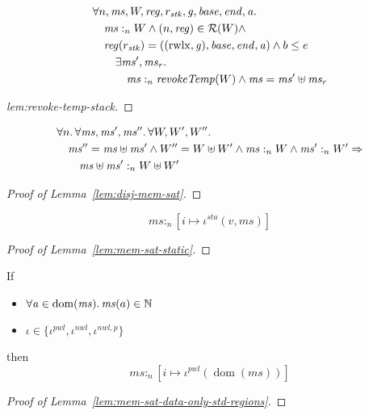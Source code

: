\documentclass[a4paper]{article}
\DeclareMathOperator{\dom}{dom}
\newcommand{\var}[1]{\mathit{#1}}
\newcommand{\hs}{\var{ms}}
\newcommand{\ms}{\hs}
\newcommand{\gl}{\var{g}}
\newcommand{\addr}{\var{a}}
\newcommand{\start}{\var{base}}
\newcommand{\addrend}{\var{end}}
\newcommand{\reg}{\var{reg}}
\newcommand{\heap}{\var{mem}}
\newcommand{\stk}{\var{stk}}
\newcommand{\nwl}{\var{nwl}}
\newcommand{\pwl}{\var{pwl}}
\newcommand{\sta}{\var{sta}}
\newcommand{\plainfun}[2]{
  \ifthenelse{\equal{#2}{}}
  {\mathit{#1}}
  {\mathit{#1}(#2)}
}
\newcommand{\revokeTemp}[1]{\plainfun{revokeTemp}{#1}}
\newcommand{\heapSat}[3][\heap]{#1 :_{#2} #3}
\newcommand{\memSat}[3][n]{\heapSat[#2]{#1}{#3}}
\newcommand{\asmType}{\plaindom{AsmType}}
\newcommand{\plaindom}[1]{\mathrm{#1}}
\newcommand{\nats}{\mathbb{N}}
\newcommand{\intr}[2]{\mathcal{#1}}
\newcommand{\regintr}[1]{\intr{R}{#1}}
\newcommand{\stdrr}{\regintr{\asmType}}
\newcommand{\npair}[2][n]{\left(#1,#2 \right)}
\newcommand{\plainperm}[1]{\mathrm{#1}}
\newcommand{\rwlx}{\plainperm{rwlx}}
\begin{document}
\begin{lemma}
  \label{lem:revoke-temp-stack}
  \begin{align*}
    & \forall n, \ms, W, \reg, r_\stk,\gl,\start,\addrend,\addr \ldotp\\
    & \quad \memSat{\ms}{W} \land \npair{\reg} \in \stdrr(W) \land \\
    & \quad \reg(r_\stk) = ((\rwlx,\gl),\start,\addrend,\addr) \land b \leq e \\
    & \qquad \exists \ms', \ms_r \ldotp \\
    & \qquad \quad \memSat{\ms }{\revokeTemp{W}} \land \ms = \ms' \uplus \ms_r
  \end{align*}
\end{lemma}
\begin{proof}[lem:revoke-temp-stack]
\end{proof}

\begin{lemma}
  \label{lem:disj-mem-sat}
  \begin{align*}
    & \forall n \ldotp \forall \ms, \ms', \ms'' \ldotp \forall W, W', W'' \ldotp\\
    & \quad \ms'' = \ms \uplus \ms' \land W'' = W \uplus W' \land \memSat{\ms}{W} \land \memSat{\ms'}{W'} \Rightarrow \\
    & \qquad \heapSat[\ms \uplus \ms' ]{n}{W \uplus W'}
  \end{align*}
\end{lemma}
\begin{proof}[Proof of Lemma~\ref{lem:disj-mem-sat}]
\end{proof}

\begin{lemma}
  \label{lem:mem-sat-static}
  \[
    \memSat{\ms}{[i \mapsto \iota^\sta(v,\ms)]}
  \]
\end{lemma}
\begin{proof}[Proof of Lemma~\ref{lem:mem-sat-static}]
\end{proof}

\begin{lemma}
  \label{lem:mem-sat-data-only-std-regions}
  If
  \begin{itemize}
  \item $\forall \addr \in \dom(\ms)\ldotp \ms(a) \in \nats$
  \item $\iota \in \{\iota^\pwl,\iota^\nwl,\iota^{\nwl,p} \}$
  \end{itemize}
  then
  \[
    \memSat{\ms}{[i \mapsto \iota^\pwl(\dom(\ms))]}
  \]
\end{lemma}
\begin{proof}[Proof of Lemma~\ref{lem:mem-sat-data-only-std-regions}]
\end{proof}
\end{document}
